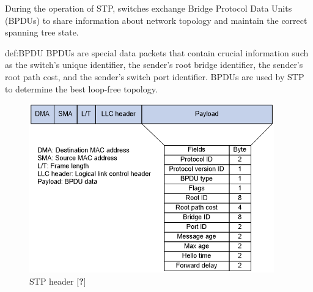 \noindent During the operation of STP, switches exchange Bridge Protocol Data Units (BPDUs) to share information about network topology and maintain the correct spanning tree state.

\begin{theo}{def:BPDU}\label{def:BPDU}
    \noindent BPDUs are special data packets that contain crucial information such as the switch's unique identifier, the sender's root bridge identifier, the sender's root path cost, and the sender's switch port identifier. BPDUs are used by STP to determine the best loop-free topology.
\end{theo}

\begin{figure}[H]
    \centering
    \includegraphics[width = 0.7\linewidth]{img/5/STP-header.png}
    \caption{STP header $[$\textbf{?}$]$}
    \label{fig:STP-header}
\end{figure}

